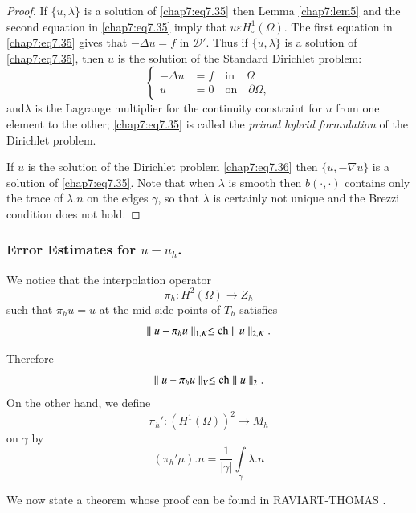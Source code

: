 \begin{proof}
If $\{u,\lambda\}$ is a solution of \eqref{chap7:eq7.35} then Lemma
\ref{chap7:lem5} and the second equation in \eqref{chap7:eq7.35} imply
that $u\varepsilon H_\circ^1(\Omega)$. The first equation in
\eqref{chap7:eq7.35} gives that $-\Delta u=f$ in $\mathscr{D}'$. Thus
if $\{u,\lambda\}$ is a solution of \eqref{chap7:eq7.35}, then $u$ is
the solution of the Standard Dirichlet problem:
\begin{equation}\label{chap7:eq7.36}
\begin{cases}
-\Delta u &= f\quad\text{in}\quad\Omega\\
u &= 0\quad\text{on}\quad \partial\Omega,
\end{cases}
\end{equation}
and\pageoriginale $\lambda$ is the Lagrange multiplier for the
continuity constraint for $u$ from one element to the other;
\eqref{chap7:eq7.35} is called the \emph{primal hybrid formulation} of
the Dirichlet problem. 

If $u$ is the solution of the Dirichlet problem \eqref{chap7:eq7.36}
then $\{u,-\nabla u\}$ is a solution of \eqref{chap7:eq7.35}. Note
that when $\lambda$ is smooth then $b(\cdotp,\cdotp)$ contains only
the trace of $\lambda.n$ on the edges $\gamma$, so that $\lambda$ is
certainly not unique and the Brezzi condition does not hold.
\end{proof}

\subsubsection{\bf Error Estimates for $u-u_h$.} We notice that the
interpolation operator 
$$
\pi_h:H^2(\Omega)\to Z_h
$$
such that $\pi_hu=u$ at the mid side points of $T_h$ satisfies 
$$
\parallel u-\pi_hu\parallel_{1,K}\leq\operatorname{ch}\parallel u\parallel_{2,K}.
$$

Therefore 
\begin{equation}\label{chap7:eq7.37}
\parallel u-\pi_hu\parallel_V\leq\operatorname{ch}\parallel u\parallel_2.
\end{equation}
On the other hand, we define 
$$
\pi_h':(H^1(\Omega))^2\to M_h
$$
on $\gamma$ by 
$$
(\pi_h'\mu).n=\frac{1}{|\gamma|}\int\limits_\gamma \lambda.n
$$

We now state a theorem whose proof can be found in RAVIART-THOMAS
\cite{key38}.

